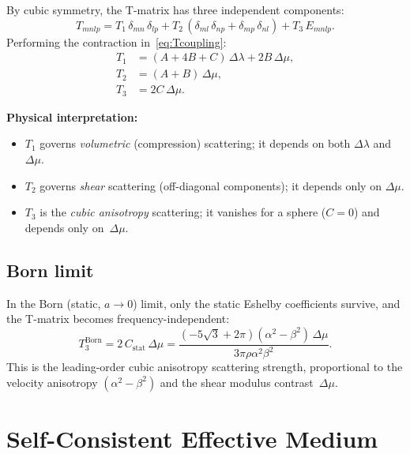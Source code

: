 \documentclass[11pt,a4paper]{article}
\newcommand{\Dlam}{\Delta\lambda}
\newcommand{\Dmu}{\Delta\mu}
\begin{document}
By cubic symmetry, the T-matrix has three independent components:
\begin{equation}
  T_{mnlp} = T_1\,\delta_{mn}\,\delta_{lp}
    + T_2\,(\delta_{ml}\,\delta_{np} + \delta_{mp}\,\delta_{nl})
    + T_3\,E_{mnlp}.
  \label{eq:Tdecomp}
\end{equation}
Performing the contraction in~\eqref{eq:Tcoupling}:
\begin{equation}
  \boxed{
  \begin{aligned}
    T_1 &= (A + 4B + C)\,\Dlam + 2B\,\Dmu, \\[4pt]
    T_2 &= (A + B)\,\Dmu, \\[4pt]
    T_3 &= 2C\,\Dmu.
  \end{aligned}
  }
  \label{eq:T123}
\end{equation}

\noindent
\textbf{Physical interpretation:}
\begin{itemize}
  \item $T_1$ governs \emph{volumetric} (compression) scattering;
    it depends on both $\Dlam$ and $\Dmu$.
  \item $T_2$ governs \emph{shear} scattering (off-diagonal
    components); it depends only on $\Dmu$.
  \item $T_3$ is the \emph{cubic anisotropy} scattering; it
    vanishes for a sphere ($C = 0$) and depends only on~$\Dmu$.
\end{itemize}

\subsection{Born limit}

In the Born (static, $a \to 0$) limit, only the static Eshelby
coefficients survive, and the T-matrix becomes frequency-independent:
\begin{equation}
  T_3^\text{Born}
  = 2\,C_\text{stat}\,\Dmu
  = \frac{(-5\sqrt{3} + 2\pi)(\alpha^2 - \beta^2)\,\Dmu}
         {3\pi\rho\alpha^2\beta^2}.
  \label{eq:T3Born}
\end{equation}
This is the leading-order cubic anisotropy scattering strength,
proportional to the velocity anisotropy
$(\alpha^2 - \beta^2)$ and the shear modulus contrast~$\Dmu$.

\section{Self-Consistent Effective Medium}
\label{sec:scm}
\end{document}
